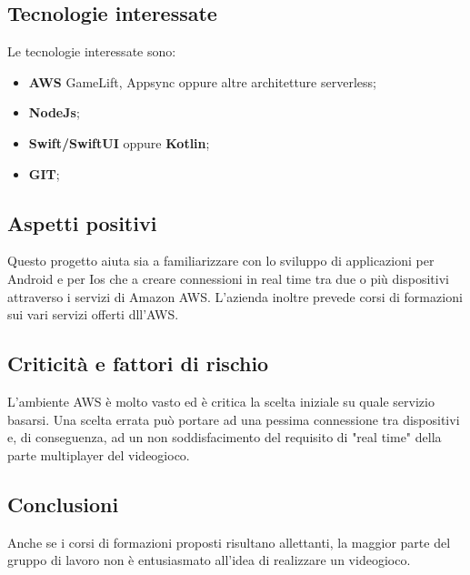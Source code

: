 \subsection{Tecnologie interessate}
Le tecnologie interessate sono:
\begin{itemize}
	\item \textbf{AWS} GameLift, Appsync oppure altre architetture serverless;
	\item \textbf{NodeJs}; 
	\item \textbf{Swift/SwiftUI} oppure \textbf{Kotlin};
	\item \textbf{GIT};
\end{itemize}
\subsection{Aspetti positivi}
Questo progetto aiuta sia a familiarizzare con lo sviluppo di applicazioni per Android e per Ios che a creare connessioni in real time tra due o più dispositivi attraverso i servizi di Amazon AWS. L'azienda inoltre prevede corsi di formazioni sui vari servizi offerti dll'AWS.
\subsection{Criticità e fattori di rischio}
L'ambiente AWS è molto vasto ed è critica la scelta iniziale su quale servizio basarsi. Una scelta errata può portare ad una pessima connessione tra dispositivi e, di conseguenza, ad un non soddisfacimento del requisito di "real time" della parte multiplayer del videogioco.
\subsection{Conclusioni}
Anche se i corsi di formazioni proposti risultano allettanti, la maggior parte del gruppo di lavoro non è entusiasmato all'idea di realizzare un videogioco.